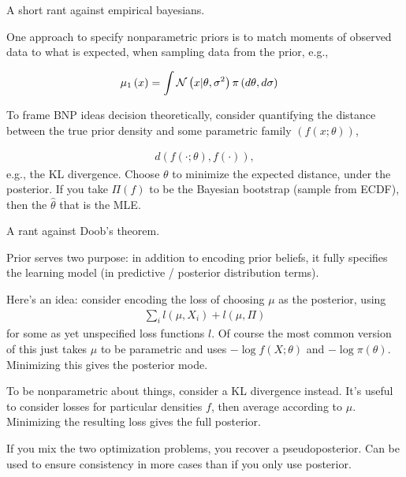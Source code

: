\documentclass{article}
\begin{document}
A short rant against empirical bayesians.

One approach to specify nonparametric priors is to match moments of observed data to what
is expected, when sampling data from the prior, e.g.,

\begin{align}
  \mu_{1}\left(x\right) &= \int \mathcal{N}\left(x \vert \theta, \sigma^{2}\right) \pi\left(d\theta, d\sigma\right)
\end{align}

To frame BNP ideas decision theoretically, consider quantifying the distance
between the true prior density and some parametric family $\left(f\left(x;
\theta\right)\right)$,

\begin{align}
d\left(f\left(\cdot; \theta\right), f\left(\cdot\right)\right),
\end{align}
e.g., the KL divergence. Choose $\theta$ to minimize the expected distance,
under the posterior. If you take $\Pi\left(f\right)$ to be the Bayesian
bootstrap (sample from ECDF), then the $\hat{\theta}$ that is the MLE.

A rant against Doob's theorem.

Prior serves two purpose: in addition to encoding prior beliefs, it fully
specifies the learning model (in predictive / posterior distribution terms).

Here's an idea: consider encoding the loss of choosing $\mu$ as the posterior,
using
\begin{align}
  \sum_{i} l\left(\mu, X_{i}\right) + l\left(\mu, \Pi\right)
\end{align}
for some as yet unspecified loss functions $l$. Of course the most common
version of this just takes $\mu$ to be parametric and uses $-\log f\left(X;
\theta\right)$ and $-\log\pi\left(\theta\right)$. Minimizing this gives the
posterior mode.

To be nonparametric about things, consider a KL divergence instead. It's useful
to consider losses for particular densities $f$, then average according to
$\mu$. Minimizing the resulting loss gives the full posterior.

If you mix the two optimization problems, you recover a pseudoposterior. Can be
used to ensure consistency in more cases than if you only use posterior.
\end{document}
